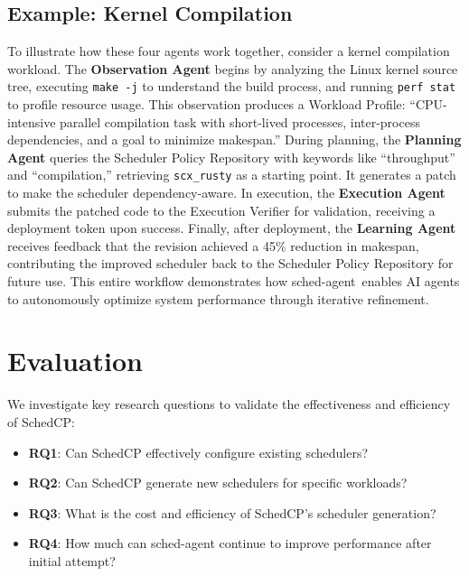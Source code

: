\documentclass[preprint]{article}
\newcommand{\sys}{SchedCP\xspace}
\newcommand{\agent}{sched-agent\xspace}
\begin{document}
\subsection{Example: Kernel Compilation}

To illustrate how these four agents work together, consider a kernel compilation workload. The \textbf{Observation Agent} begins by analyzing the Linux kernel source tree, executing \texttt{make -j} to understand the build process, and running \texttt{perf stat} to profile resource usage. This observation produces a Workload Profile: ``CPU-intensive parallel compilation task with short-lived processes, inter-process dependencies, and a goal to minimize makespan.'' During planning, the \textbf{Planning Agent} queries the Scheduler Policy Repository with keywords like ``throughput'' and ``compilation,'' retrieving \texttt{scx\_rusty} as a starting point. It generates a patch to make the scheduler dependency-aware. In execution, the \textbf{Execution Agent} submits the patched code to the Execution Verifier for validation, receiving a deployment token upon success. Finally, after deployment, the \textbf{Learning Agent} receives feedback that the revision achieved a 45\% reduction in makespan, contributing the improved scheduler back to the Scheduler Policy Repository for future use. This entire workflow demonstrates how \agent\ enables AI agents to autonomously optimize system performance through iterative refinement.
\section{Evaluation}
\label{sec:evaluation}


We investigate key research questions to validate the effectiveness and efficiency of \sys:

\begin{itemize}
\item \textbf{RQ1}: Can \sys effectively configure existing schedulers?
\item \textbf{RQ2}: Can \sys generate new schedulers for specific workloads?
\item \textbf{RQ3}: What is the cost and efficiency of \sys's scheduler generation?
\item \textbf{RQ4}: How much can \agent continue to improve performance after initial attempt?
\end{itemize}
\end{document}
